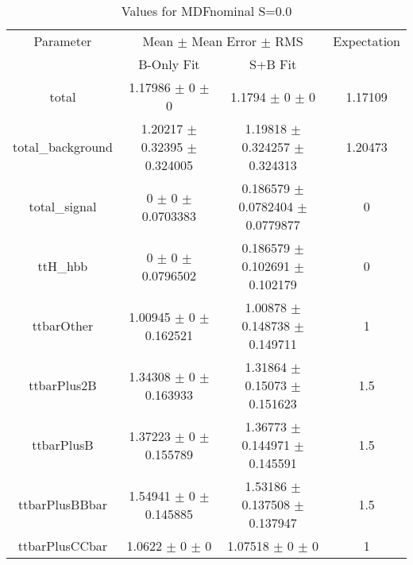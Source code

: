 \begin{table}
\centering
\caption{Values for MDFnominal S=0.0}
\begin{tabular}{cccc}
\toprule
Parameter & \multicolumn{2}{c}{Mean $\pm$ Mean Error $\pm$ RMS} & Expectation\\
 & B-Only Fit & S+B Fit & \\
\midrule
total & \num{1.17986} $\pm$ \num{0} $\pm$ \num{0} & \num{1.1794} $\pm$ \num{0} $\pm$ \num{0} & \num{1.17109}\\
total\_background & \num{1.20217} $\pm$ \num{0.32395} $\pm$ \num{0.324005} & \num{1.19818} $\pm$ \num{0.324257} $\pm$ \num{0.324313} & \num{1.20473}\\
total\_signal & \num{0} $\pm$ \num{0} $\pm$ \num{0.0703383} & \num{0.186579} $\pm$ \num{0.0782404} $\pm$ \num{0.0779877} & \num{0}\\
ttH\_hbb & \num{0} $\pm$ \num{0} $\pm$ \num{0.0796502} & \num{0.186579} $\pm$ \num{0.102691} $\pm$ \num{0.102179} & \num{0}\\
ttbarOther & \num{1.00945} $\pm$ \num{0} $\pm$ \num{0.162521} & \num{1.00878} $\pm$ \num{0.148738} $\pm$ \num{0.149711} & \num{1}\\
ttbarPlus2B & \num{1.34308} $\pm$ \num{0} $\pm$ \num{0.163933} & \num{1.31864} $\pm$ \num{0.15073} $\pm$ \num{0.151623} & \num{1.5}\\
ttbarPlusB & \num{1.37223} $\pm$ \num{0} $\pm$ \num{0.155789} & \num{1.36773} $\pm$ \num{0.144971} $\pm$ \num{0.145591} & \num{1.5}\\
ttbarPlusBBbar & \num{1.54941} $\pm$ \num{0} $\pm$ \num{0.145885} & \num{1.53186} $\pm$ \num{0.137508} $\pm$ \num{0.137947} & \num{1.5}\\
ttbarPlusCCbar & \num{1.0622} $\pm$ \num{0} $\pm$ \num{0} & \num{1.07518} $\pm$ \num{0} $\pm$ \num{0} & \num{1}\\
\bottomrule
\end{tabular}
\end{table}
